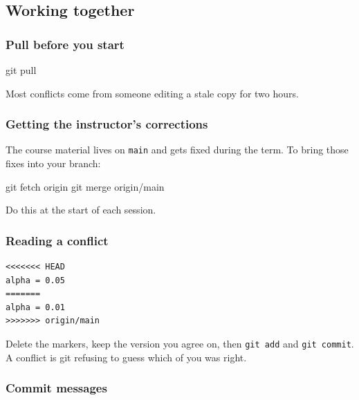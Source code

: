\documentclass[
  letterpaper,
  10pt,
  twoside,
  openright,
  numbers=noenddot,
  chapterprefix=true]{scrbook}
\newenvironment{Shaded}{}{}
\newcommand{\FunctionTok}[1]{\textcolor[rgb]{0.44,0.26,0.76}{#1}}
\newcommand{\NormalTok}[1]{\textcolor[rgb]{0.14,0.16,0.18}{#1}}
\begin{document}
\subsection{Working together}\label{working-together}

\subsubsection{Pull before you start}\label{pull-before-you-start}

\begin{Shaded}
\begin{Highlighting}[]
\FunctionTok{git}\NormalTok{ pull}
\end{Highlighting}
\end{Shaded}

Most conflicts come from someone editing a stale copy for two hours.

\subsubsection{Getting the instructor's
corrections}\label{getting-the-instructors-corrections}

The course material lives on \texttt{main} and gets fixed during the
term. To bring those fixes into your branch:

\begin{Shaded}
\begin{Highlighting}[]
\FunctionTok{git}\NormalTok{ fetch origin}
\FunctionTok{git}\NormalTok{ merge origin/main}
\end{Highlighting}
\end{Shaded}

Do this at the start of each session.

\subsubsection{Reading a conflict}\label{reading-a-conflict}

\begin{verbatim}
<<<<<<< HEAD
alpha = 0.05
=======
alpha = 0.01
>>>>>>> origin/main
\end{verbatim}

Delete the markers, keep the version you agree on, then
\texttt{git\ add} and \texttt{git\ commit}. A conflict is git refusing
to guess which of you was right.

\subsubsection{Commit messages}\label{commit-messages}
\end{document}

